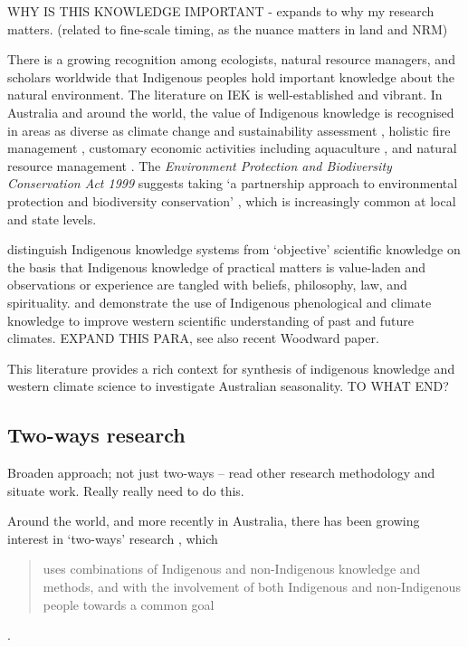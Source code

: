 WHY IS THIS KNOWLEDGE IMPORTANT - expands to why my research matters.
(related to fine-scale timing, as the nuance matters in land and NRM)

There is a growing recognition among ecologists, natural resource managers, and 
scholars worldwide that Indigenous peoples hold important knowledge about the 
natural environment. The literature on IEK is well-established and vibrant.  In 
Australia and around the world, the value of Indigenous knowledge is recognised 
in areas as diverse as climate change and sustainability assessment
\citep[eg.][]{cochran2015}, holistic fire management \citep[eg.][]{clarke2009,price2012}, 
customary economic activities including aquaculture \citep{woodward2012a}, and 
natural resource management \citep[eg.][]{prober2011}.  The \textit{Environment 
Protection and Biodiversity Conservation Act 1999} suggests taking `a 
partnership approach to environmental protection and biodiversity conservation'
\citep{ens2012}, which is increasingly common at local and state levels.  

\citet{turner2009} distinguish Indigenous knowledge systems from `objective' 
scientific knowledge on the basis that Indigenous knowledge of practical 
matters is value-laden and observations or experience are tangled with beliefs, 
philosophy, law, and spirituality.  \citet{green2010a} and \citet{clarke2009} 
demonstrate the use of Indigenous phenological and climate knowledge to improve 
western scientific understanding of past and future climates.
EXPAND THIS PARA, see also recent Woodward paper.

This literature provides a rich context for synthesis of indigenous knowledge 
and western climate science to investigate Australian seasonality.
TO WHAT END?



\subsection{Two-ways research}
Broaden approach; not just two-ways – read other research methodology and 
situate work.  Really really need to do this.

Around the world, and more recently in Australia, there has been growing 
interest in `two-ways' research \citep{turner2009,prober2011}, 
which \blockquote{uses combinations of Indigenous and non-Indigenous knowledge and 
methods, and with the involvement of both Indigenous and non-Indigenous people 
towards a common goal} \citep{ens2014}.  

